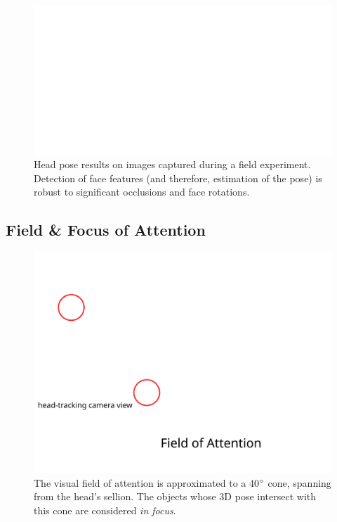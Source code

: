 \documentclass{sig-alternate}
\begin{document}
\begin{figure}[t]
    \centering
    \includegraphics[width=\linewidth]{head_pose_real_world}
    \caption{Head pose results on images captured during a field experiment.
    Detection of face features (and therefore, estimation of the pose) is robust
    to significant occlusions and face rotations.}
    \label{head_pose_real_world}
\end{figure}

\subsection{Field \& Focus of Attention}

\begin{figure}
    \centering
    \includegraphics[width=0.9\columnwidth]{field_of_attention}
    \caption{\small The visual field of attention is approximated to a
        40$\degree$ cone, spanning from the head's sellion. The objects whose 3D
    pose intersect with this cone are considered \emph{in focus}.}
    \label{fig:vfoa}
\end{figure}
\end{document}
